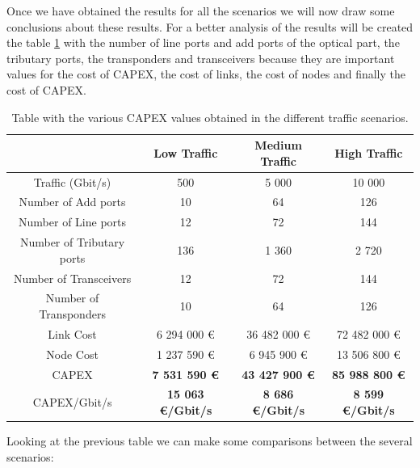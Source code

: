 Once we have obtained the results for all the scenarios we will now draw some conclusions about these results. For a better analysis of the results will be created the table \ref{table_comparative_transluc_surv} with the number of line ports and add ports of the optical part, the tributary ports, the transponders and transceivers because they are important values for the cost of CAPEX, the cost of links, the cost of nodes and finally the cost of CAPEX.\\

\begin{table}[h!]
\centering
\begin{tabular}{| c | c | c | c |}
 \hline
  & Low Traffic & Medium Traffic  & High Traffic \\
 \hline\hline
 Traffic (Gbit/s) & 500 & 5 000 & 10 000 \\ \hline
 Number of Add ports & 10 & 64 & 126 \\ \hline
 Number of Line ports & 12 & 72 & 144 \\ \hline
 Number of Tributary ports & 136 & 1 360 & 2 720 \\ \hline
 Number of Transceivers & 12 & 72 & 144 \\ \hline
 Number of Transponders & 10 & 64 & 126 \\ \hline
 Link Cost & 6 294 000 \euro & 36 482 000 \euro & 72 482 000 \euro \\ \hline
 Node Cost & 1 237 590 \euro & 6 945 900 \euro & 13 506 800 \euro \\ \hline
 CAPEX & \textbf{7 531 590 \euro} & \textbf{43 427 900 \euro} & \textbf{85 988 800 \euro} \\ \hline
 CAPEX/Gbit/s & \textbf{15 063 \euro/Gbit/s} & \textbf{8 686 \euro/Gbit/s} & \textbf{8 599 \euro/Gbit/s}\\
 \hline
\end{tabular}
\caption{Table with the various CAPEX values obtained in the different traffic scenarios.}
\label{table_comparative_transluc_surv}
\end{table}

Looking at the previous table we can make some comparisons between the several scenarios:

